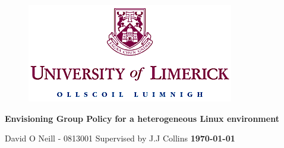 \documentclass[10pt,a4paper,notitlepage,svgnames]{report}
\begin{document}
\sloppy	
	

	
	\vspace*{\fill}
	
	\begin{figure}[h!]
		\centering
		\includegraphics[scale=1.2]{figures/ul.png}
	\end{figure}	
	
	\vspace{15mm}
	\begin{center}
	
		\begin{minipage}[b]{0.57\linewidth}
		
			\begin{center}
			
				\normalsize
				{
					\textbf{\huge{Envisioning Group Policy}}
					\newline
					\vspace{2mm}
					\textbf{\large{for a heterogeneous Linux environment}}
				}
				
			\end{center}

		\end{minipage}		
		
	\end{center}
			
	\begin{center}
		
		\vspace{10mm}
		
		\begin{minipage}[b]{0.30\linewidth}
		
			\begin{center}
			
				\large
				{
					David O Neill - 0813001
					\newline
					Supervised by J.J Collins
					\newline 
					\newline
					\textbf{\today}
				}
				
			\end{center}

		\end{minipage}	
				
	\end{center}
	
\end{document}
